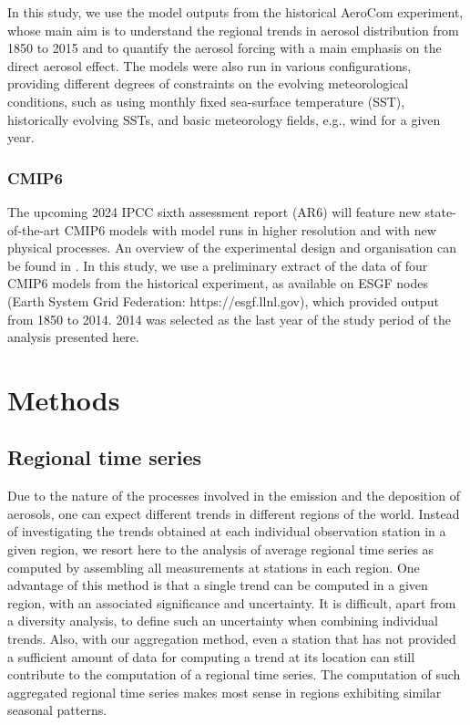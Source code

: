 \documentclass[acp, manuscript]{copernicus}
\begin{document}
In this study, we use the model outputs from the historical AeroCom experiment, whose main aim is to understand the regional trends in aerosol distribution from 1850 to 2015 and to quantify the aerosol forcing with a main emphasis on the direct aerosol effect. The models were also run in various configurations, providing different degrees of constraints on the evolving meteorological conditions, such as using monthly fixed sea-surface temperature (SST), historically evolving SSTs, and basic meteorology fields, e.g., wind for a given year.

\subsubsection{CMIP6}
The upcoming 2024 IPCC sixth assessment report (AR6) will feature new state-of-the-art CMIP6 models with model runs in higher resolution and with new physical processes. An overview of the experimental design and organisation can be found in \cite{eyring2016overview}.  In this study, we use a preliminary extract of the data of four CMIP6 models from the historical experiment, as available on ESGF nodes (Earth System Grid Federation: https://esgf.llnl.gov), which provided output from 1850 to 2014. 2014 was selected as the last year of the study period of the analysis presented here.



\section{Methods}

\subsection{Regional time series}
Due to the nature of the processes involved in the emission and the deposition of aerosols, one can expect different trends in different regions of the world. Instead of investigating the trends obtained at each individual observation station in a given region, we resort here to the analysis of average regional time series as computed by assembling all measurements at stations in each region. One advantage of this method is that a single trend can be computed in a given region, with an associated significance and uncertainty. It is difficult, apart from a diversity analysis, to define such an uncertainty when combining individual trends. Also, with our aggregation method, even a station that has not provided a sufficient amount of data for computing a trend at its location can still contribute to the computation of a regional time series. The computation of such aggregated regional time series makes most sense in regions exhibiting similar seasonal patterns.
\end{document}
